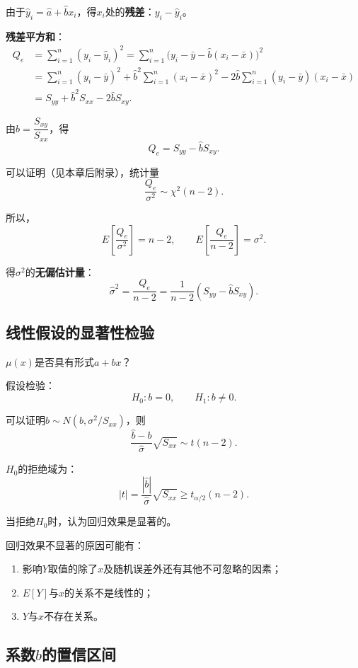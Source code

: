 \documentclass[11pt,a4paper]{report}
\theoremstyle{definition}
\begin{document}
由于$\hat{y}_{i}=\hat{a}+\hat{b}x_{i}$，得$x_{i}$处的\textbf{残差}：$y_{i}-\hat{y}_{i}$。

\textbf{残差平方和}：
\[
\begin{aligned}
Q_{e}&=\sum_{i=1}^{n}(y_{i}-\hat{y}_{i})^{2}
=\sum_{i=1}^{n}\bigl(y_{i}-\bar{y}-\hat{b}(x_{i}-\bar{x})\bigr)^{2}\\
&=\sum_{i=1}^{n}(y_{i}-\bar{y})^{2}+\hat{b}^{2}\sum_{i=1}^{n}(x_{i}-\bar{x})^{2}
-2\hat{b}\sum_{i=1}^{n}(y_{i}-\bar{y})(x_{i}-\bar{x})\\
&=S_{yy}+\hat{b}^{2}S_{xx}-2\hat{b}S_{xy}.
\end{aligned}
\]

由$\hat{b}=\dfrac{S_{xy}}{S_{xx}}$，得
\[
Q_{e}=S_{yy}-\hat{b}S_{xy}.
\]

可以证明（见本章后附录），统计量
\[
\frac{Q_{e}}{\sigma^{2}}\sim\chi^{2}(n-2).
\]

所以，
\[
E\left[\frac{Q_{e}}{\sigma^{2}}\right]=n-2,\qquad
E\left[\frac{Q_{e}}{n-2}\right]=\sigma^{2}.
\]

得$\sigma^{2}$的\textbf{无偏估计量}：
\[
\hat{\sigma}^{2}=\frac{Q_{e}}{n-2}=\frac{1}{n-2}(S_{yy}-\hat{b}S_{xy}).
\]

\subsection{线性假设的显著性检验}

$\mu(x)$是否具有形式$a+bx$？

假设检验：
\[
H_{0}\colon b=0,\qquad H_{1}\colon b\neq 0.
\]

可以证明$\hat{b}\sim N\!\left(b,\sigma^{2}/S_{xx}\right)$，则
\[
\frac{\hat{b}-b}{\hat{\sigma}}\sqrt{S_{xx}}\sim t(n-2).
\]

$H_{0}$的拒绝域为：
\[
|t|=\frac{|\hat{b}|}{\hat{\sigma}}\sqrt{S_{xx}}\geq t_{\alpha/2}(n-2).
\]

当拒绝$H_{0}$时，认为回归效果是显著的。

回归效果不显著的原因可能有：
\begin{enumerate}[label=(\arabic*),leftmargin=2em]
    \item 影响$Y$取值的除了$x$及随机误差外还有其他不可忽略的因素；
    \item $E[Y]$与$x$的关系不是线性的；
    \item $Y$与$x$不存在关系。
\end{enumerate}

\subsection{系数\texorpdfstring{$b$}{b}的置信区间}
\end{document}
